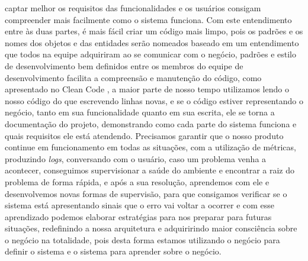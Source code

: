     captar melhor os requisitos das funcionalidades e os usuários consigam
    compreender mais facilmente como o sistema funciona. Com este entendimento
    entre às duas partes, é mais fácil criar um código mais limpo, pois os padrões
    e os nomes dos objetos e das entidades serão nomeados baseado em um entendimento
    que todos na equipe adquiriram ao se comunicar com o negócio, padrões e estilo de
    desenvolvimento bem definidos entre os membros do equipe de desenvolvimento facilita
    a compreensão e manutenção do código, como apresentado no Clean Code \cite{CleanCode},
    a maior parte de nosso tempo utilizamos lendo o nosso código do que escrevendo
    linhas novas, e se o código estiver representando o negócio, tanto em sua
    funcionalidade quanto em sua escrita, ele se torna a documentação do projeto,
    demonstrando como cada parte do sistema funciona e quais requisitos ele está
    atendendo. \newline
    Precisamos garantir que o nosso produto continue em funcionamento em todas as
    situações, com a utilização de métricas, produzindo \textit{logs}, conversando
    com o usuário, caso um problema venha a acontecer, conseguimos supervisionar
    a saúde do ambiente e encontrar a raiz do problema de forma rápida, e após a
    sua resolução, aprendemos com ele e desenvolvemos novas formas de supervisão,
    para que consigamos verificar se o sistema está apresentando sinais que o erro
    vai voltar a ocorrer e com esse aprendizado podemos elaborar estratégias para
    nos preparar para futuras situações, redefinindo a nossa arquitetura e
    adquiririndo maior consciência sobre o negócio na totalidade, pois desta forma
    estamos utilizando o negócio para definir o sistema e o sistema para aprender
    sobre o negócio.
